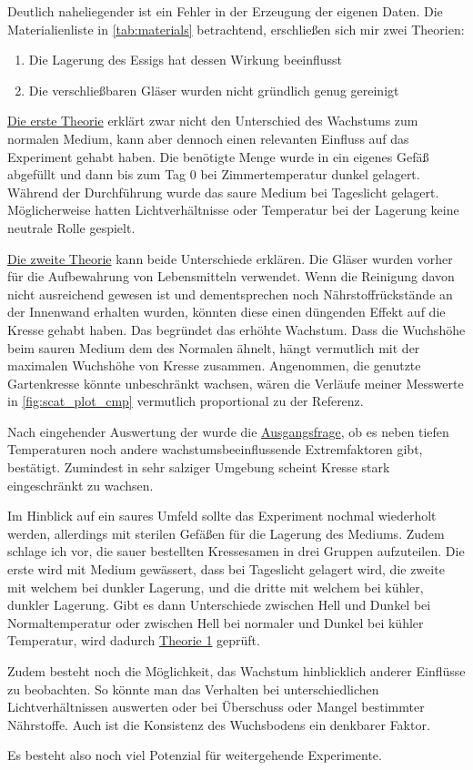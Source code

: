     Deutlich naheliegender ist ein Fehler in der Erzeugung der eigenen Daten. Die Materialienliste in \autoref{tab:materials} betrachtend, erschließen sich mir zwei Theorien:
    \begin{enumerate}[1.]
        \item \label{th:1} Die Lagerung des Essigs hat dessen Wirkung beeinflusst
        \item \label{th:2} Die verschließbaren Gläser wurden nicht gründlich genug gereinigt
    \end{enumerate} 
    \hyperref[th:1]{Die erste Theorie} erklärt zwar nicht den Unterschied des Wachstums zum normalen Medium, kann aber dennoch einen relevanten Einfluss auf das Experiment gehabt haben. Die benötigte Menge wurde in ein eigenes Gefäß abgefüllt und dann bis zum Tag 0 bei Zimmertemperatur dunkel gelagert. Während der Durchführung wurde das saure Medium bei Tageslicht gelagert. Möglicherweise hatten Lichtverhältnisse oder Temperatur bei der Lagerung keine neutrale Rolle gespielt.

    \hyperref[th:2]{Die zweite Theorie} kann beide Unterschiede erklären. Die Gläser wurden vorher für die Aufbewahrung von Lebensmitteln verwendet. Wenn die Reinigung davon nicht ausreichend gewesen ist und dementsprechen noch Nährstoffrückstände an der Innenwand erhalten wurden, könnten diese einen düngenden Effekt auf die Kresse gehabt haben. Das begründet das erhöhte Wachstum. Dass die Wuchshöhe beim sauren Medium dem des Normalen ähnelt, hängt vermutlich mit der maximalen Wuchshöhe von Kresse zusammen. Angenommen, die genutzte Gartenkresse könnte unbeschränkt wachsen, wären die Verläufe meiner Messwerte in \autoref{fig:scat_plot_cmp} vermutlich proportional zu der Referenz.

    Nach eingehender Auswertung der  wurde die \hyperref[hypothese]{Ausgangsfrage}, ob es neben tiefen Temperaturen noch andere wachstumsbeeinflussende Extremfaktoren gibt, bestätigt. Zumindest in sehr salziger Umgebung scheint Kresse stark eingeschränkt zu wachsen.

    Im Hinblick auf ein saures Umfeld sollte das Experiment nochmal wiederholt werden, allerdings mit sterilen Gefäßen für die Lagerung des Mediums. Zudem schlage ich vor, die sauer bestellten Kressesamen in drei Gruppen aufzuteilen. Die erste wird mit Medium gewässert, dass bei Tageslicht gelagert wird, die zweite mit welchem bei dunkler Lagerung, und die dritte mit welchem bei kühler, dunkler Lagerung. Gibt es dann Unterschiede zwischen Hell und Dunkel bei Normaltemperatur oder zwischen Hell bei normaler und Dunkel bei kühler Temperatur, wird dadurch \hyperref[th:1]{Theorie 1} geprüft.

    Zudem besteht noch die Möglichkeit, das Wachstum hinblicklich anderer Einflüsse zu beobachten. So könnte man das Verhalten bei unterschiedlichen Lichtverhältnissen auswerten oder bei Überschuss oder Mangel bestimmter Nährstoffe. Auch ist die Konsistenz des Wuchsbodens ein denkbarer Faktor.

    Es besteht also noch viel Potenzial für weitergehende Experimente.
